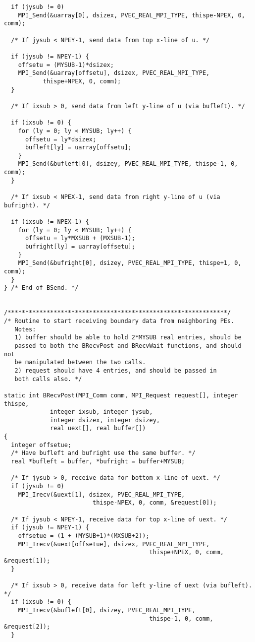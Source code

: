 \begin{verbatim}
  if (jysub != 0)
    MPI_Send(&uarray[0], dsizex, PVEC_REAL_MPI_TYPE, thispe-NPEX, 0, comm);

  /* If jysub < NPEY-1, send data from top x-line of u. */

  if (jysub != NPEY-1) {
    offsetu = (MYSUB-1)*dsizex;
    MPI_Send(&uarray[offsetu], dsizex, PVEC_REAL_MPI_TYPE, 
           thispe+NPEX, 0, comm);
  }

  /* If ixsub > 0, send data from left y-line of u (via bufleft). */

  if (ixsub != 0) {
    for (ly = 0; ly < MYSUB; ly++) {
      offsetu = ly*dsizex;
      bufleft[ly] = uarray[offsetu];
    }
    MPI_Send(&bufleft[0], dsizey, PVEC_REAL_MPI_TYPE, thispe-1, 0, comm);   
  }

  /* If ixsub < NPEX-1, send data from right y-line of u (via bufright). */

  if (ixsub != NPEX-1) {
    for (ly = 0; ly < MYSUB; ly++) {
      offsetu = ly*MXSUB + (MXSUB-1);
      bufright[ly] = uarray[offsetu];
    }
    MPI_Send(&bufright[0], dsizey, PVEC_REAL_MPI_TYPE, thispe+1, 0, comm);   
  }
} /* End of BSend. */


/**************************************************************/
/* Routine to start receiving boundary data from neighboring PEs.
   Notes:
   1) buffer should be able to hold 2*MYSUB real entries, should be
   passed to both the BRecvPost and BRecvWait functions, and should not
   be manipulated between the two calls.
   2) request should have 4 entries, and should be passed in 
   both calls also. */

static int BRecvPost(MPI_Comm comm, MPI_Request request[], integer thispe,
		     integer ixsub, integer jysub,
		     integer dsizex, integer dsizey,
		     real uext[], real buffer[])
{
  integer offsetue;
  /* Have bufleft and bufright use the same buffer. */
  real *bufleft = buffer, *bufright = buffer+MYSUB;

  /* If jysub > 0, receive data for bottom x-line of uext. */
  if (jysub != 0)
    MPI_Irecv(&uext[1], dsizex, PVEC_REAL_MPI_TYPE,
    					 thispe-NPEX, 0, comm, &request[0]);

  /* If jysub < NPEY-1, receive data for top x-line of uext. */
  if (jysub != NPEY-1) {
    offsetue = (1 + (MYSUB+1)*(MXSUB+2));
    MPI_Irecv(&uext[offsetue], dsizex, PVEC_REAL_MPI_TYPE,
                                         thispe+NPEX, 0, comm, &request[1]);
  }

  /* If ixsub > 0, receive data for left y-line of uext (via bufleft). */
  if (ixsub != 0) {
    MPI_Irecv(&bufleft[0], dsizey, PVEC_REAL_MPI_TYPE,
                                         thispe-1, 0, comm, &request[2]);
  }


\end{verbatim}
